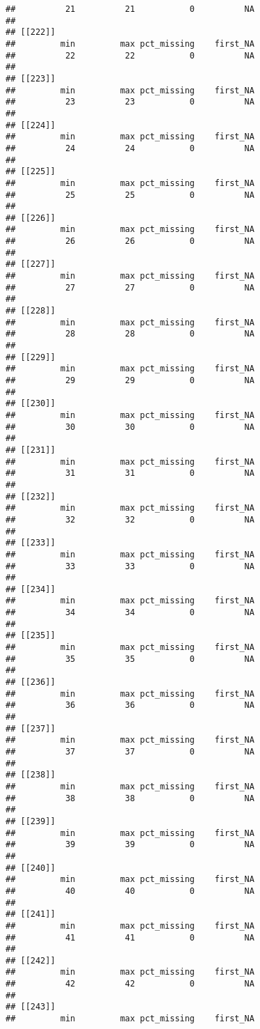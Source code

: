 \documentclass[
]{article}
\begin{document}
\begin{verbatim}
##          21          21           0          NA 
## 
## [[222]]
##         min         max pct_missing    first_NA 
##          22          22           0          NA 
## 
## [[223]]
##         min         max pct_missing    first_NA 
##          23          23           0          NA 
## 
## [[224]]
##         min         max pct_missing    first_NA 
##          24          24           0          NA 
## 
## [[225]]
##         min         max pct_missing    first_NA 
##          25          25           0          NA 
## 
## [[226]]
##         min         max pct_missing    first_NA 
##          26          26           0          NA 
## 
## [[227]]
##         min         max pct_missing    first_NA 
##          27          27           0          NA 
## 
## [[228]]
##         min         max pct_missing    first_NA 
##          28          28           0          NA 
## 
## [[229]]
##         min         max pct_missing    first_NA 
##          29          29           0          NA 
## 
## [[230]]
##         min         max pct_missing    first_NA 
##          30          30           0          NA 
## 
## [[231]]
##         min         max pct_missing    first_NA 
##          31          31           0          NA 
## 
## [[232]]
##         min         max pct_missing    first_NA 
##          32          32           0          NA 
## 
## [[233]]
##         min         max pct_missing    first_NA 
##          33          33           0          NA 
## 
## [[234]]
##         min         max pct_missing    first_NA 
##          34          34           0          NA 
## 
## [[235]]
##         min         max pct_missing    first_NA 
##          35          35           0          NA 
## 
## [[236]]
##         min         max pct_missing    first_NA 
##          36          36           0          NA 
## 
## [[237]]
##         min         max pct_missing    first_NA 
##          37          37           0          NA 
## 
## [[238]]
##         min         max pct_missing    first_NA 
##          38          38           0          NA 
## 
## [[239]]
##         min         max pct_missing    first_NA 
##          39          39           0          NA 
## 
## [[240]]
##         min         max pct_missing    first_NA 
##          40          40           0          NA 
## 
## [[241]]
##         min         max pct_missing    first_NA 
##          41          41           0          NA 
## 
## [[242]]
##         min         max pct_missing    first_NA 
##          42          42           0          NA 
## 
## [[243]]
##         min         max pct_missing    first_NA 

\end{verbatim}
\end{document}
